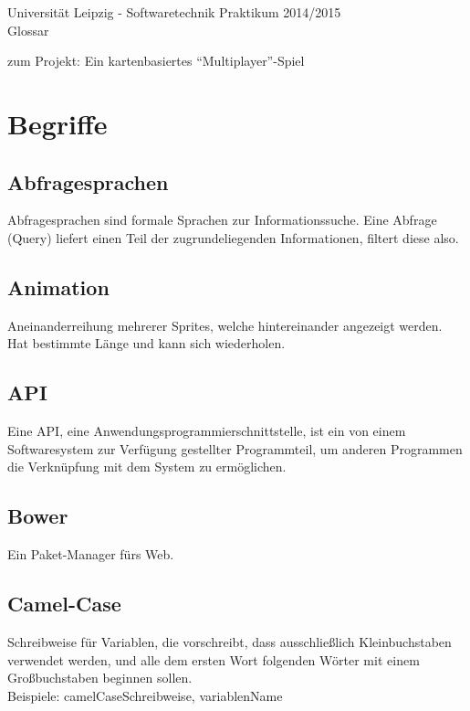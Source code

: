 \documentclass[11pt,a4paper]{article}
\begin{document}
{\center \large Universität Leipzig - Softwaretechnik Praktikum 2014/2015\\}
{\center \Huge Glossar \\}
\par\bigskip

{\small zum Projekt: Ein kartenbasiertes “Multiplayer”-Spiel}

\par\bigskip

\tableofcontents 

\clearpage





    
    
    

    
    

    

    
    
\section{Begriffe}
\subsection{Abfragesprachen}
Abfragesprachen sind formale Sprachen zur Informationssuche. Eine  Abfrage (Query) liefert einen Teil der zugrundeliegenden Informationen, filtert diese also.
\subsection{Animation}
Aneinanderreihung mehrerer Sprites, welche hintereinander angezeigt werden.
Hat bestimmte Länge und kann sich wiederholen.
\subsection{API}
Eine API, eine  Anwendungsprogrammierschnittstelle, ist ein von einem Softwaresystem zur  Verfügung gestellter Programmteil, um anderen Programmen die  Verknüpfung mit dem System zu ermöglichen.
\subsection{Bower}
Ein Paket-Manager fürs Web.
\subsection{Camel-Case}
Schreibweise für Variablen, die vorschreibt, dass ausschließlich Kleinbuchstaben verwendet werden, und alle dem ersten Wort folgenden Wörter mit einem Großbuchstaben beginnen sollen. \\
        Beispiele: camelCaseSchreibweise, variablenName
\end{document}

